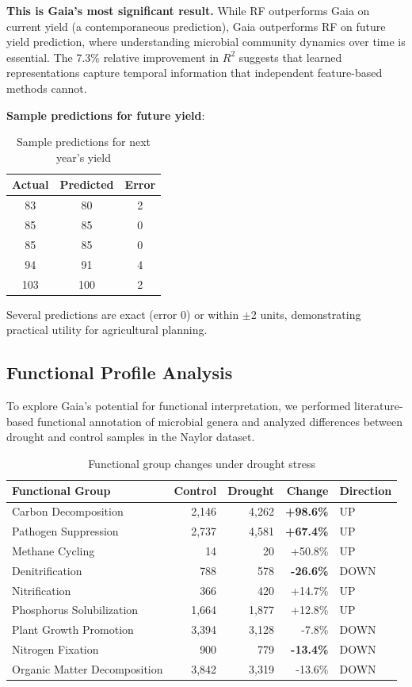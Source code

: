 \documentclass[11pt,a4paper]{article}
\begin{document}
\textbf{This is Gaia's most significant result.} While RF outperforms Gaia on current yield (a contemporaneous prediction), Gaia outperforms RF on future yield prediction, where understanding microbial community dynamics over time is essential. The 7.3\% relative improvement in $R^2$ suggests that learned representations capture temporal information that independent feature-based methods cannot.

\textbf{Sample predictions for future yield}:

\begin{table}[H]
\centering
\caption{Sample predictions for next year's yield}
\begin{tabular}{ccc}
\toprule
\textbf{Actual} & \textbf{Predicted} & \textbf{Error} \\
\midrule
83 & 80 & 2 \\
85 & 85 & 0 \\
85 & 85 & 0 \\
94 & 91 & 4 \\
103 & 100 & 2 \\
\bottomrule
\end{tabular}
\end{table}

Several predictions are exact (error 0) or within $\pm$2 units, demonstrating practical utility for agricultural planning.

\subsection{Functional Profile Analysis}

To explore Gaia's potential for functional interpretation, we performed literature-based functional annotation of microbial genera and analyzed differences between drought and control samples in the Naylor dataset.

\begin{table}[H]
\centering
\caption{Functional group changes under drought stress}
\label{tab:function}
\begin{tabular}{lrrrl}
\toprule
\textbf{Functional Group} & \textbf{Control} & \textbf{Drought} & \textbf{Change} & \textbf{Direction} \\
\midrule
Carbon Decomposition & 2,146 & 4,262 & \textbf{+98.6\%} & UP \\
Pathogen Suppression & 2,737 & 4,581 & \textbf{+67.4\%} & UP \\
Methane Cycling & 14 & 20 & +50.8\% & UP \\
Denitrification & 788 & 578 & \textbf{-26.6\%} & DOWN \\
Nitrification & 366 & 420 & +14.7\% & UP \\
Phosphorus Solubilization & 1,664 & 1,877 & +12.8\% & UP \\
Plant Growth Promotion & 3,394 & 3,128 & -7.8\% & DOWN \\
Nitrogen Fixation & 900 & 779 & \textbf{-13.4\%} & DOWN \\
Organic Matter Decomposition & 3,842 & 3,319 & -13.6\% & DOWN \\
\bottomrule
\end{tabular}
\end{table}
\end{document}
